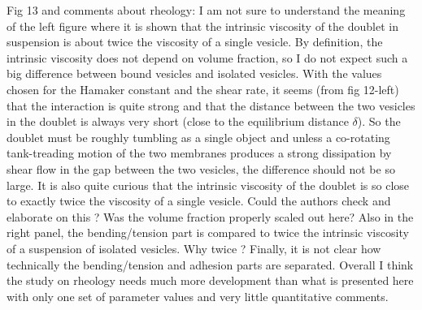 \documentclass[11pt]{article}
\newcommand{\comment}[1]{{\color{blue} #1}}
\begin{document}
\noindent
\comment{Fig 13 and comments about rheology: I am not sure to understand
the meaning of the left figure where it is shown that the intrinsic
viscosity of the doublet in suspension is about twice the viscosity of a
single vesicle. By definition, the intrinsic viscosity does not depend
on volume fraction, so I do not expect such a big difference between
bound vesicles and isolated vesicles. With the values chosen for the
Hamaker constant and the shear rate, it seems (from fig 12-left) that
the interaction is quite strong and that the distance between the two
vesicles in the doublet is always very short (close to the equilibrium
distance $\delta$). So the doublet must be roughly tumbling as a single
object and unless a co-rotating tank-treading motion of the two
membranes produces a strong dissipation by shear flow in the gap between
the two vesicles, the difference should not be so large. It is also
quite curious that the intrinsic viscosity of the doublet is so close to
exactly twice the viscosity of a single vesicle. Could the authors check
and elaborate on this ? Was the volume fraction properly scaled out
here? Also in the right panel, the bending/tension part is compared to
twice the intrinsic viscosity of a suspension of isolated vesicles. Why
twice ? Finally, it is not clear how technically the bending/tension and
adhesion parts are separated.  Overall I think the study on rheology
needs much more development than what is presented here with only one
set of parameter values and very little quantitative comments.}
\end{document}
